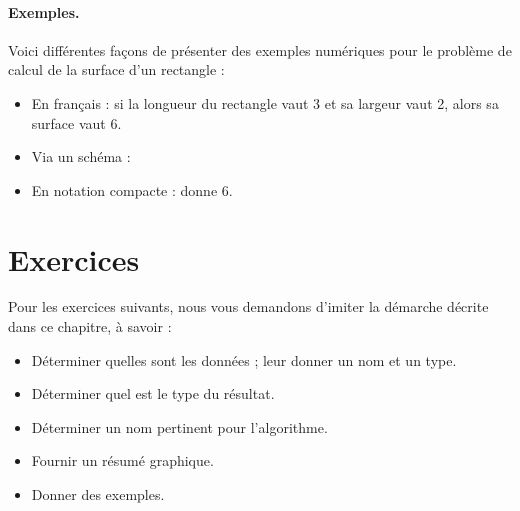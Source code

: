 		\begin{Emphase}
			\paragraph{Exemples.}
			Voici différentes façons de présenter des exemples numériques
			pour le problème de calcul de la surface d'un rectangle :
			\begin{itemize}
			\item En français : 
				si la longueur du rectangle vaut 3 et sa largeur vaut 2, 
				alors sa surface vaut 6.			
			\item Via un schéma :	
				\begin{center}
				\end{center}
			\item En notation compacte :
				 donne $6$.
			\end{itemize}
		\end{Emphase}
	
	\section{Exercices}
	
		Pour les exercices suivants, 
		nous vous demandons d’imiter la démarche décrite dans ce chapitre, 
		à savoir :
		\begin{itemize}
			\item Déterminer quelles sont les données ;
				leur donner un nom et un type.
			\item Déterminer quel est le type du résultat.
			\item Déterminer un nom pertinent pour l'algorithme.
			\item Fournir un résumé graphique.
			\item Donner des exemples.
		\end{itemize}
	
